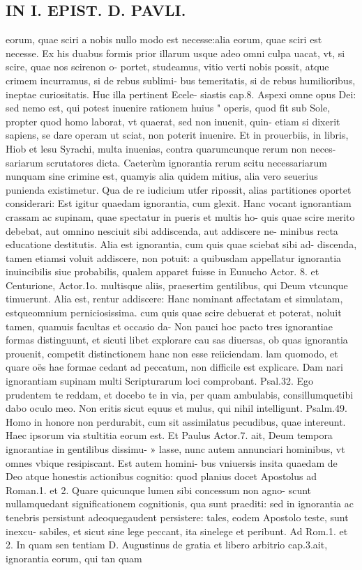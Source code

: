 \documentclass{article}
\begin{document}
\begin{pages}
\section*{IN I. EPIST. D. PAVLI. }
\marginpar{[ p.41 ]}\pstart eorum, quae sciri a nobis nullo modo est necesse:alia eorum, quae sciri est necesse. Ex his duabus formis prior illarum usque  adeo omni culpa uacat, vt, si scire, quae nos scirenon o- portet, studeamus, vitio verti nobis possit, atque  crimem incurramus, si de rebus sublimi- bus temeritatis, si de rebus humilioribus, ineptae curiositatis. Huc illa pertinent Ecele- siastis cap.8. Aspexi omne opus Dei: sed nemo est, qui potest inuenire rationem huius " operis, quod fit sub Sole, propter quod homo laborat, vt quaerat, sed non inuenit, quin-   etiam si dixerit sapiens, se dare operam ut sciat, non poterit inuenire. Et in prouerbiis, in libris, Hiob et lesu Syrachi, multa inuenias, contra quarumcunque  rerum non neces- sariarum scrutatores dicta.  \pend\pstart Caeterùm ignorantia rerum scitu necessariarum nunquam sine crimine est, quamyis alia quidem mitius, alia vero seuerius punienda existimetur. Qua de re iudicium utfer ripossit, alias partitiones oportet considerari: Est igitur quaedam ignorantia, cum glexit. Hanc vocant ignorantiam crassam ac supinam, quae spectatur in pueris et multis ho- quis quae scire merito debebat, aut omnino nesciuit sibi addiscenda, aut addiscere ne- minibus recta educatione destitutis. Alia est ignorantia, cum quis quae sciebat sibi ad- discenda, tamen etiamsi voluit addiscere, non potuit: a quibusdam appellatur ignorantia inuincibilis siue probabilis, qualem apparet fuisse in Eunucho Actor. 8. et Centurione, Actor.1o. multisque  aliis, praesertim gentilibus, qui Deum vtcunque  timuerunt. Alia est, rentur addiscere: Hanc nominant affectatam et simulatam, estqueomnium perniciosissima. cum quis quae scire debuerat et poterat, noluit tamen, quamuis facultas et occasio da- Non pauci hoc pacto tres ignorantiae formas distinguunt, et sicuti libet explorare cau sas diuersas, ob quas ignorantia prouenit, competit distinctionem hanc non esse reiiciendam. lam quomodo, et quare oës hae formae cedant ad peccatum, non difficile est explicare. Dam nari ignorantiam supinam multi Scripturarum loci comprobant. Psal.32. Ego prudentem te reddam, et docebo te in via, per quam ambulabis, consillumquetibi dabo oculo meo. Non eritis sicut equus et mulus, qui nihil intelligunt. Psalm.49. Homo in honore non perdurabit, cum sit assimilatus pecudibus, quae intereunt. Haec ipsorum via stultitia   eorum est. Et Paulus Actor.7. ait, Deum tempora ignorantiae in gentilibus dissimu- » lasse, nunc autem annunciari hominibus, vt omnes vbique  resipiscant. Est autem homini- bus vniuersis insita quaedam de Deo atque  honestis actionibus cognitio: quod planius docet Apostolus ad Roman.1. et 2. Quare quicunque  lumen sibi concessum non agno- scunt nullamquedant significationem cognitionis, qua sunt praediti: sed in ignorantia ac tenebris persistunt adeoquegaudent persistere: tales, eodem Apostolo teste, sunt inexcu- sabiles, et sicut sine lege peccant, ita sinelege et peribunt. Ad Rom.1. et 2. In quam sen tentiam D. Augustinus de gratia et libero arbitrio cap.3.ait, ignorantia eorum, qui tan quam 
\end{pages}
\end{document}
